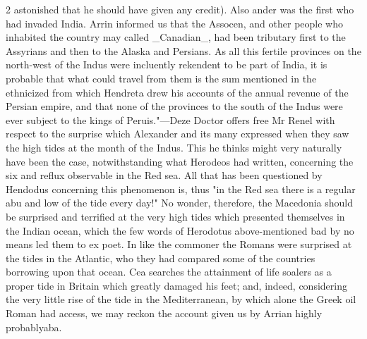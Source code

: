 \documentclass[10pt]{article}
\begin{document}
\begin{multicols}{2}\raggedcolumns
astonished that he should have given any credit). Also ander was the first who had invaded India. Arrin informed us that the Assocen, and other people who inhabited the country may called \_Canadian\_, had been tributary first to the Assyrians and then to the Alaska and Persians. As all this fertile provinces on the north-west of the Indus were incluently rekendent to be part of India, it is probable that what could travel from them is the sum mentioned in the ethnicized from which Hendreta drew his accounts of the annual revenue of the Persian empire, and that none of the provinces to the south of the Indus were ever subject to the kings of Peruis."—Deze Doctor offers free Mr Renel with respect to the surprise which Alexander and its many expressed when they saw the high tides at the month of the Indus. This he thinks might very naturally have been the case, notwithstanding what Herodeos had written, concerning the six and reflux observable in the Red sea. All that has been questioned by Hendodus concerning this phenomenon is, thus "in the Red sea there is a regular abu and low of the tide every day!" No wonder, therefore, the Macedonia should be surprised and terrified at the very high tides which presented themselves in the Indian ocean, which the few words of Herodotus above-mentioned bad by no means led them to ex poet. In like the commoner the Romans were surprised at the tides in the Atlantic, who they had compared some of the countries borrowing upon that ocean. Cea searches the attainment of life soalers as a proper tide in Britain which greatly damaged his feet; and, indeed, considering the very little rise of the tide in the Mediterranean, by which alone the Greek oil Roman had access, we may reckon the account given us by Arrian highly probablyaba.


\end{multicols}
\end{document}
